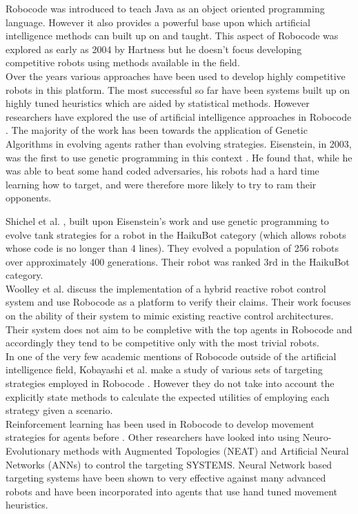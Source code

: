 \documentclass{article}
\theoremstyle{plain}
\theoremstyle{definition}
\theoremstyle{remark}
\begin{document}
Robocode was introduced to teach Java as an object oriented programming language. However it also provides a powerful base upon which artificial intelligence methods can built up on and taught. This aspect of Robocode was explored as early as 2004 by Hartness \cite{Hartness} but he doesn't focus developing competitive robots using methods available in the field.\\

Over the years various approaches have been used to develop highly competitive robots in this platform. The most successful so far have been systems built up on highly tuned heuristics which are aided by statistical methods. However researchers have explored the use of artificial intelligence approaches in Robocode \cite{strategies, gp1, gp2}. The majority of the work has been towards the application of Genetic Algorithms in evolving agents rather than evolving strategies.  Eisenstein, in 2003, was the first to use genetic programming in this context \cite{gp2}. He found that, while he was able to beat some hand coded adversaries, his robots had a hard time learning how to target, and were therefore more likely to try to ram their opponents.

Shichel et al. \cite{gp1}, built upon Eisenstein's work and use genetic programming to evolve tank strategies for a robot in the HaikuBot category (which allows robots whose code is no longer than 4 lines). They evolved a population of 256 robots over approximately 400 generations. Their robot was ranked 3rd in the HaikuBot category.\\

Woolley et al. \cite{woolley} discuss the implementation of a hybrid reactive robot control system and use Robocode as a platform to verify their claims. Their work focuses on the ability of their system to mimic existing reactive control architectures. Their system does not aim to be completive with the top agents in Robocode and accordingly they tend to be competitive only with the most trivial robots.\\

In one of the very few academic mentions of Robocode outside of the artificial intelligence field, Kobayashi et al. make a study of various sets of targeting strategies employed in Robocode \cite{strategies}. However they do not take into account the explicitly state methods to calculate the expected utilities of employing each strategy given a scenario.\\

Reinforcement learning has been used in Robocode to develop movement strategies for agents before \cite{gade}. Other researchers have looked into using Neuro-Evolutionary methods with Augmented Topologies (NEAT) and Artificial Neural Networks (ANNs) \cite{nielsenAI} to control the targeting SYSTEMS. Neural Network based targeting systems have been shown to very effective against many advanced robots and have been incorporated into agents that use hand tuned movement heuristics.\\
\end{document}
